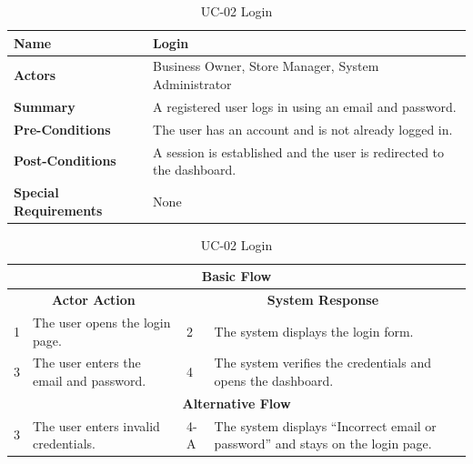 \documentclass{StockSense}
\begin{document}
\begin{table}[!htbp]
\centering
\caption{UC-02 Login}
{\small\linespread{1}\selectfont
\begin{tabular}{|p{}|p{}|}
\hline
\textbf{Name} & Login \\ \hline
\textbf{Actors} & Business Owner, Store Manager, System Administrator \\ \hline
\textbf{Summary} & A registered user logs in using an email and password. \\ \hline
\textbf{Pre-Conditions} & The user has an account and is not already logged in. \\ \hline
\textbf{Post-Conditions} & A session is established and the user is redirected to the dashboard. \\ \hline
\textbf{Special Requirements} & None \\ \hline
\end{tabular}\par\nointerlineskip
\begin{tabular}{|p{}|p{}|p{}|p{}|}
\multicolumn{4}{|c|}{\textbf{Basic Flow}} \\ \hline
\multicolumn{2}{|c|}{\textbf{Actor Action}} & \multicolumn{2}{c|}{\textbf{System Response}} \\ \hline
1 & The user opens the login page. & 2 & The system displays the login form. \\ \hline
3 & The user enters the email and password. & 4 & The system verifies the credentials and opens the dashboard. \\ \hline
\multicolumn{4}{|c|}{\textbf{Alternative Flow}} \\ \hline
3 & The user enters invalid credentials. & 4-A & The system displays ``Incorrect email or password'' and stays on the login page. \\ \hline
\end{tabular}\par}
\end{table}
\end{document}
